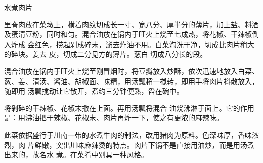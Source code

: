 \begin{recipe}{水煮肉片}

\ingredients


\cooking

\step 里脊肉放在菜墩上，横着肉纹切成长一寸、宽八分、厚半分的薄片，加上盐、料酒
及蛋清豆粉，同时和匀。混合油放在锅内于旺火上烧至七成热，将花椒、干辣椒倒入炸成
 金红色，捞起剁成碎末，泌去炸油不用。白菜淘洗干净，切成比肉片稍大的碎块。姜去
皮，切成二分见方的薄片。葱白 切成八分长的段。

\step 混合油放在锅内于旺火上烧至刚冒烟时，将豆瓣放入炒酥，依次迅速地放入白菜、
葱、姜、清汤、酱油、胡椒面、味精，用汤瓢稍一搅转，即用手将肉片抖散放入，随即用
汤瓢搅动让它散开，煮约三分钟便熟，舀在碗中。

\step 将剁碎的干辣椒、花椒末撒在上面。再用汤瓢将混合 油烧沸淋于面上。它的作用
是：用沸油把干辣椒、花椒末、肉片再炸一下，使之有更浓的麻辣味。

\notes

此菜依据盛行于川南一带的水煮牛肉的制法，改用猪肉为原料。色深味厚，香味浓烈，肉
片鲜嫩，突出川味麻辣烫的特点。肉片下锅不是直接用油炒，而是用汤煮出来的，故名水
煮。在菜肴中别具一种风格。

\end{recipe}

